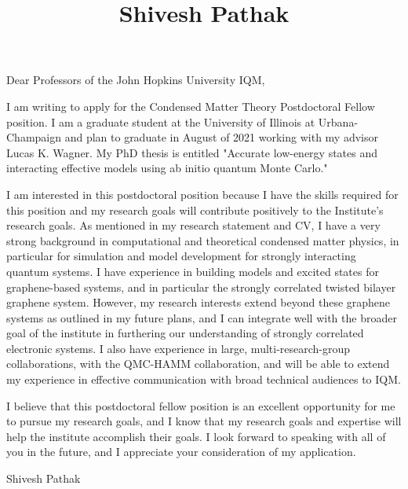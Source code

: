 \documentclass{article}
\title{Shivesh Pathak}
\date{\vspace{-10ex}}
\begin{document}
\maketitle

\noindent Dear Professors of the John Hopkins University IQM,

I am writing to apply for the Condensed Matter Theory Postdoctoral Fellow position.
I am a graduate student at the University of Illinois at Urbana-Champaign and plan to graduate in August of 2021 working with my advisor Lucas K. Wagner.
My PhD thesis is entitled "Accurate low-energy states and interacting effective models using ab initio quantum Monte Carlo."

I am interested in this postdoctoral position because I have the skills required for this position and my research goals will contribute positively to the Institute's research goals.
As mentioned in my research statement and CV, I have a very strong background in computational and theoretical condensed matter physics, in particular for simulation and model development for strongly interacting quantum systems.
I have experience in building models and excited states for graphene-based systems, and in particular the strongly correlated twisted bilayer graphene system.
However, my research interests extend beyond these graphene systems as outlined in my future plans, and I can integrate well with the broader goal of the institute in furthering our understanding of strongly correlated electronic systems.
I also have experience in large, multi-research-group collaborations, with the QMC-HAMM collaboration, and will be able to extend my experience in effective communication with broad technical audiences to IQM.

I believe that this postdoctoral fellow position is an excellent opportunity for me to pursue my research goals, and I know that my research goals and expertise will help the institute accomplish their goals.
I look forward to speaking with all of you in the future, and I appreciate your consideration of my application.

\noindent Shivesh Pathak
\end{document}
